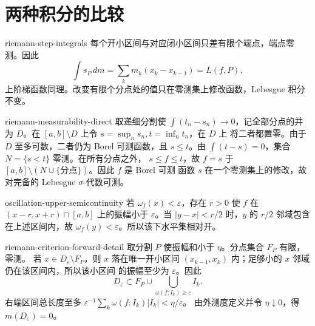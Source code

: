 \chapter{两种积分的比较}

\begin{solution}{riemann-step-integrals}
每个开小区间与对应闭小区间只差有限个端点，端点零测。因此
\[
 \int s_P\,dm=\sum_km_k(x_k-x_{k-1})=L(f,P),
\]
上阶梯函数同理。改变有限个分点处的值只在零测集上修改函数，Lebesgue
积分不变。
\end{solution}

\begin{solution}{riemann-measurability-direct}
取递细分割使 \(\int(t_n-s_n)\to0\)，记全部分点的并为 \(D\)。在
\([a,b]\setminus D\) 上令 \(s=\sup_ns_n,t=\inf_nt_n\)，在 \(D\) 上
将二者都置零。由于 \(D\) 至多可数，二者仍为 Borel 可测函数，且 \(s\le t\)。由
\(\int(t-s)=0\)，集合 \(N=\{s<t\}\) 零测。在所有分点之外，
\(s\le f\le t\)，故 \(f=s\) 于
\([a,b]\setminus(N\cup\{\text{分点}\})\)。因此 \(f\) 是 Borel 可测
函数 \(s\) 在一个零测集上的修改，故对完备的 Lebesgue
\(\sigma\)-代数可测。
\end{solution}

\begin{solution}{oscillation-upper-semicontinuity}
若 \(\omega_f(x)<\varepsilon\)，存在 \(r>0\) 使 \(f\) 在
\((x-r,x+r)\cap[a,b]\) 上的振幅小于 \(\varepsilon\)。当
\(|y-x|<r/2\) 时，\(y\) 的 \(r/2\) 邻域包含在上述区间内，故
\(\omega_f(y)<\varepsilon\)。所以该下水平集相对开。
\end{solution}

\begin{solution}{riemann-criterion-forward-detail}
取分割 \(P\) 使振幅和小于 \(\eta\)。分点集合 \(F_P\) 有限，零测。
若 \(x\in D_\varepsilon\setminus F_P\)，则 \(x\) 落在唯一开小区间
\((x_{k-1},x_k)\) 内；足够小的 \(x\) 邻域仍在该区间内，所以该小区间
的振幅至少为 \(\varepsilon\)。因此
\[
 D_\varepsilon\subset F_P\cup
 \bigcup_{\omega(f;I_k)\ge\varepsilon}I_k.
\]
右端区间总长度至多
\(\varepsilon^{-1}\sum_k\omega(f;I_k)|I_k|<\eta/\varepsilon\)。
由外测度定义并令 \(\eta\downarrow0\)，得
\(m(D_\varepsilon)=0\)。
\end{solution}


